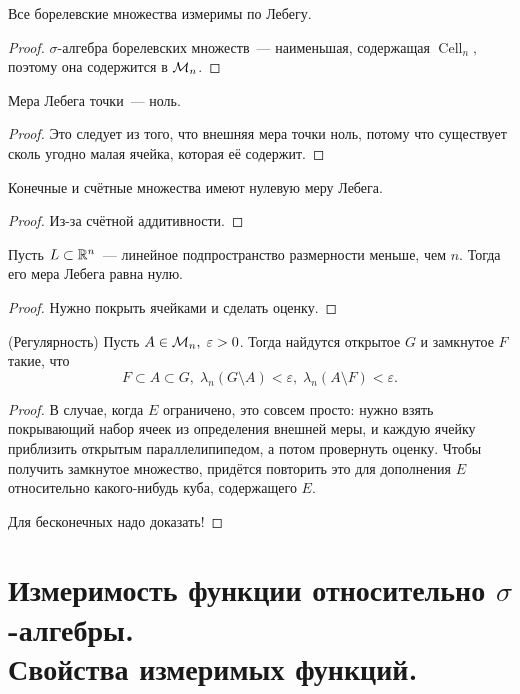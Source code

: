 \documentclass{notes}
\DeclareMathOperator{\Cell}{Cell}
\begin{document}
	\begin{pr}
		Все борелевские множества измеримы по Лебегу.
		\begin{proof}
			$\sigma$-алгебра борелевских множеств~--- наименьшая, содержащая $\Cell_n,$ поэтому она содержится в $\mathcal{M}_n$.
		\end{proof}
	\end{pr}

	\begin{pr}
		Мера Лебега точки~--- ноль.
		\begin{proof}
			Это следует из того, что внешняя мера точки ноль, потому что существует сколь угодно малая ячейка, которая её содержит.
		\end{proof}
	\end{pr}

	\begin{pr}
		Конечные и счётные множества имеют нулевую меру Лебега.
		\begin{proof}
			Из-за счётной аддитивности.
		\end{proof}
	\end{pr}

	\begin{pr}
		Пусть $L \subset \mathbb{R}^n$~--- линейное подпространство размерности меньше, чем $n$. Тогда его мера Лебега равна нулю.
		\begin{proof}
			Нужно покрыть ячейками и сделать оценку.
		\end{proof}
	\end{pr}

	\begin{pr}(Регулярность)
		Пусть $A \in \mathcal{M}_n, \; \varepsilon > 0$. Тогда найдутся открытое $G$ и замкнутое $F$ такие, что 
		\[
			F \subset A \subset G, \; \lambda_n(G \setminus A) < \varepsilon, \; \lambda_n(A \setminus F) < \varepsilon. 
		\]
		\begin{proof}
			В случае, когда $E$ ограничено, это совсем просто: нужно взять покрывающий набор ячеек из определения внешней меры, и каждую ячейку приблизить открытым параллелипипедом, а потом провернуть оценку. Чтобы получить замкнутое множество, придётся повторить это для дополнения $E$ относительно какого-нибудь куба, содержащего $E$.

			Для бесконечных надо доказать!
		\end{proof}
	\end{pr}

\section{Измеримость функции относительно \texorpdfstring{$\sigma$}{σ}-алгебры. \\Свойства измеримых функций.}
\end{document}
